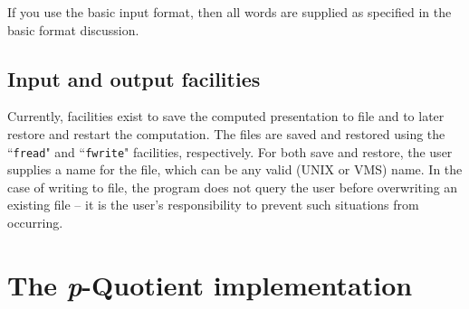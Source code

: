\documentclass[12pt]{article}
\begin{document}
If you use the basic input format, then all words are
supplied as specified in the basic format discussion.

\subsection{Input and output facilities}
Currently, facilities exist to save the computed presentation to file
and to later restore and restart the computation. The files are saved and
restored using the ``\texttt{fread}" and  ``\texttt{fwrite}" facilities, 
respectively. 
For both save and restore, the user supplies a name for the file, 
which can be any valid (UNIX or VMS) name. In the case of writing to file, 
the program does not query the user before overwriting 
an existing file -- it is the user's responsibility to prevent 
such situations from occurring.

\section{The {\it p}-Quotient implementation}
\end{document}
